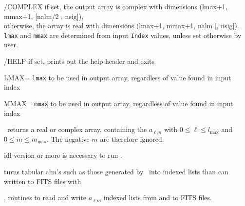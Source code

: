 \begin{keywords}
  \begin{kwlist}{} %
    \item[/COMPLEX] %
if set, the output array is complex with dimensions
          (lmax+1, mmax+1, [nalm/2 , nsig]),\\
      otherwise, the array is real with dimensions
          (lmax+1, mmax+1, nalm [, nsig]). \\
{\tt lmax} and {\tt mmax} are determined from input {\tt Index} values, unless set otherwise
by user.
    \item[/HELP] %
	if set, prints out the help header and exits
    \item[LMAX=] %
{\tt lmax} to be used in output array, regardless of
      value found in input index
    \item[MMAX=] %
{\tt mmax} to be used in output array, regardless of
      value found in input index
  \end{kwlist}
\end{keywords}  

\begin{codedescription}
{%
\thedocid\ returns a real or complex array, containing the $a_{\ell m}$ with
$0 \le \ell \le l_\textrm{max}$ and $0 \le m \le m_\textrm{max}$. The negative $m$ are
therefore ignored.
}
\end{codedescription}



\begin{related}
  \begin{sulist}{} %
    \item[idl] version \idlversion or more is necessary to run \thedocid.
    \item[\htmlref{alm\_t2i}{idl:alm_t2i}] turns tabular alm's such as those generated by
\thedocid\ into indexed lists than can written to FITS files with
  \item[\htmlref{alm2fits}{idl:alm2fits}, \htmlref{fits2alm}{idl:fits2alm}]
routines to read and write $a_{\ell m}$ indexed lists from and to FITS files.
  \end{sulist}
\end{related}

